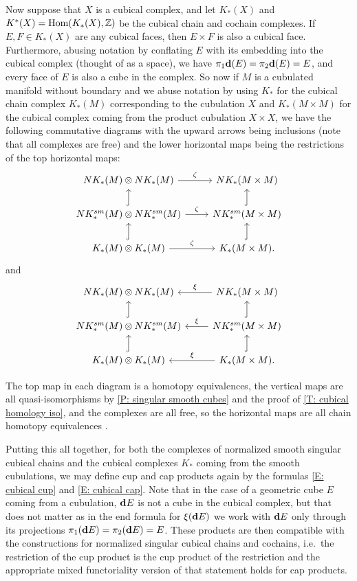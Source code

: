 Now suppose that $X$ is a cubical complex, and let $K_*(X)$ and $K^*(X) = \textup{Hom}(K_*(X),\mathbb{Z})$ be the cubical chain and cochain complexes.
If $E, F \in K_*(X)$ are any cubical faces, then $E \times F$ is also a cubical face.
Furthermore, abusing notation by conflating $E$ with its embedding into the cubical complex (thought of as a space), we have $\pi_1\mathbf{d}(E) = \pi_2\mathbf{d}(E) = E$, and every face of $E$ is also a cube in the complex.
So now if $M$ is a cubulated manifold without boundary and we abuse notation by using $K_*$ for the cubical chain complex $K_*(M)$ corresponding to the cubulation $X$ and $K_*(M \times M)$ for the cubical complex coming from the product cubulation $X \times X$, we have the following commutative diagrams with the upward arrows being inclusions (note that all complexes are free) and the lower horizontal maps being the restrictions of the top horizontal maps:
\[
\begin{tikzcd}
	NK_*(M) \otimes NK_*(M) \arrow{r}{\zeta} & NK_*(M \times M) \\
	NK^{sm}_*(M) \otimes NK^{sm}_*(M) \arrow{r}{\zeta} \arrow[u, hook] & NK^{sm}_*(M \times M) \arrow[u, hook] \\
	K_*(M) \otimes K_*(M) \arrow{r}{\zeta} \arrow[u, hook] & K_*(M \times M). \arrow[u, hook]
\end{tikzcd}
\]
and
\[
\begin{tikzcd}
	NK_*(M) \otimes NK_*(M) & \arrow[l, "\xi"'] NK_*(M \times M) \\
	NK^{sm}_*(M) \otimes NK^{sm}_*(M) \arrow[u, hook] & \arrow[l, "\xi"'] NK^{sm}_*(M \times M) \arrow[u, hook] \\
	K_*(M) \otimes K_*(M) \arrow[u, hook] & \arrow[l, "\xi"'] K_*(M \times M). \arrow[u, hook]
\end{tikzcd}
\]

The top map in each diagram is a homotopy equivalences, the vertical maps are all quasi-isomorphisms by \cref{P: singular smooth cubes} and the proof of \cref{T: cubical homology iso},
and the complexes are all free, so the horizontal maps are all chain homotopy equivalences \cite[Theorem 46.2]{Mun84}.

Putting this all together, for both the complexes of normalized smooth singular cubical chains and the cubical complexes $K_*$ coming from the smooth cubulations, we may define cup and cap products again by the formulas \eqref{E: cubical cup} and \eqref{E: cubical cap}.
Note that in the case of a geometric cube $E$ coming from a cubulation, $\mathbf{d} E$ is not a cube in the cubical complex, but that does not matter as in the end formula for $\xi(\mathbf{d} E)$ we work with $\mathbf{d} E$ only through its projections $\pi_1(\mathbf{d} E) = \pi_2(\mathbf{d} E) = E$.
These products are then compatible with the constructions for normalized singular cubical chains and cochains, i.e.\ the restriction of the cup product is the cup product of the restriction and the appropriate mixed functoriality version of that statement holds for cap products.

